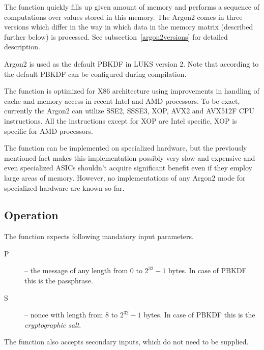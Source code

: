 \documentclass[nolof,digital]{fithesis3}
\begin{document}
The function quickly fills up given amount of memory and performs a sequence of computations over values stored in this memory. The Argon2 comes in three versions which differ in the way in which data in the memory matrix (described further below) is processed. See subsection~\ref{argon2versions} for detailed description.

Argon2 is used as the default PBKDF in LUKS version 2. Note that according to \parencite{cryptsetupmanual} the default PBKDF can be configured during compilation.

The function is optimized for X86 architecture using improvements in handling of cache and memory access in recent Intel and AMD processors. To be exact, currently the Argon2 can utilize SSE2, SSSE3, XOP, AVX2 and AVX512F CPU instructions. All the instructions except for XOP are Intel specific, XOP is specific for AMD processors.

The function can be implemented on specialized hardware, but the previously mentioned fact makes this implementation possibly very slow and expensive and even specialized ASICs shouldn't acquire significant benefit even if they employ large areas of memory. However, no implementations of any Argon2 mode for specialized hardware are known so far.

\subsection{Operation}
The function expects following mandatory input parameters.

\begin{description}
\item[P] -- the message of any length from 0 to \(2^{32} - 1\) bytes. In case of PBKDF this is the passphrase.

\item[S] -- nonce with length from 8 to \(2^{32} - 1\) bytes. In case of PBKDF this is the \emph{cryptographic salt}.
\end{description}

The function also accepts secondary inputs, which do not need to be supplied.
\end{document}
